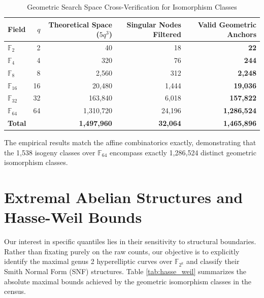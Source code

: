 \documentclass[11pt,letterpaper]{article}
\begin{document}
\begin{table}[h]
\centering
\caption{Geometric Search Space Cross-Verification for Isomorphism Classes}
\label{tab:geometric_space}
\begin{tabular}{lrrrr}
\toprule
Field & $q$ & Theoretical Space ($5q^3$) & Singular Nodes Filtered & Valid Geometric Anchors \\
\midrule
$\mathbb{F}_2$ & 2 & 40 & 18 & \textbf{22} \\
$\mathbb{F}_4$ & 4 & 320 & 76 & \textbf{244} \\
$\mathbb{F}_8$ & 8 & 2,560 & 312 & \textbf{2,248} \\
$\mathbb{F}_{16}$ & 16 & 20,480 & 1,444 & \textbf{19,036} \\
$\mathbb{F}_{32}$ & 32 & 163,840 & 6,018 & \textbf{157,822} \\
$\mathbb{F}_{64}$ & 64 & 1,310,720 & 24,196 & \textbf{1,286,524} \\
\midrule
\textbf{Total} & & \textbf{1,497,960} & \textbf{32,064} & \textbf{1,465,896} \\
\bottomrule
\end{tabular}
\end{table}

The empirical results match the affine combinatorics exactly, demonstrating that the 1,538 isogeny classes over $\mathbb{F}_{64}$ encompass exactly 1,286,524 distinct geometric isomorphism classes. 

\section{Extremal Abelian Structures and Hasse-Weil Bounds}
Our interest in specific quantiles lies in their sensitivity to structural boundaries. Rather than fixating purely on the raw counts, our objective is to explicitly identify the maximal genus 2 hyperelliptic curves over $\mathbb{F}_{2^k}$ and classify their Smith Normal Form (SNF) structures. Table \ref{tab:hasse_weil} summarizes the absolute maximal bounds achieved by the geometric isomorphism classes in the census.
\end{document}
